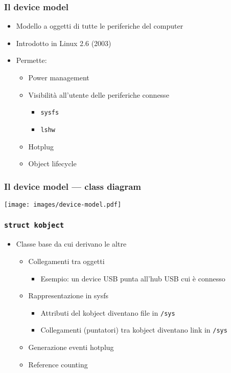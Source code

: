 \documentclass[xetex,table]{beamer}
\begin{document}
\begin{frame}
  \frametitle{Il device model}
  \begin{itemize}
  \item Modello a oggetti di tutte le periferiche del computer
  \item Introdotto in Linux 2.6 (2003)
  \item Permette:
    \begin{itemize}
    \item Power management
    \item Visibilità all'utente delle periferiche connesse
      \begin{itemize}
      \item \texttt{sysfs}
      \item \texttt{lshw}
      \end{itemize}
    \item Hotplug
    \item Object lifecycle
    \end{itemize}
  \end{itemize}
\end{frame}

\begin{frame}
  \frametitle{Il device model --- class diagram}
  \begin{center}
    \texttt{[image: images/device-model.pdf]}
  \end{center}
\end{frame}

\begin{frame}
  \frametitle{\texttt{struct kobject}}
  \begin{itemize}
  \item Classe base da cui derivano le altre
    \begin{itemize}
    \item Collegamenti tra oggetti
      \begin{itemize}
      \item Esempio: un device USB punta all'hub USB cui è connesso
      \end{itemize}
    \item Rappresentazione in sysfs
      \begin{itemize}
      \item Attributi del kobject diventano file in \texttt{/sys}
      \item Collegamenti (puntatori) tra kobject diventano link in
        \texttt{/sys}
      \end{itemize}
    \item Generazione eventi hotplug
    \item Reference counting
    \end{itemize}
  \end{itemize}
\end{frame}
\end{document}
